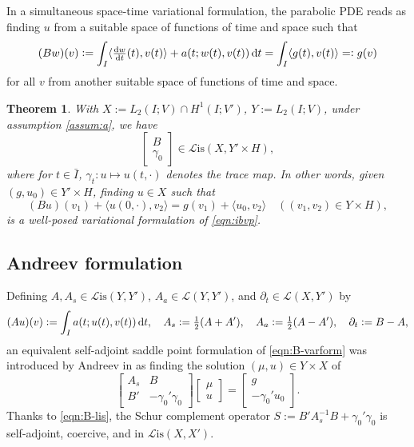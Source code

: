 \documentclass[11pt,a4paper,oneside,english]{amsart}
\numberwithin{equation}{section}
\newtheorem{theorem}{Theorem}
\numberwithin{theorem}{section}
\theoremstyle{definition}
\newcommand{\la}{\langle}
\newcommand{\ra}{\rangle}
\newcommand{\cL}{\mathcal L}
\newcommand{\Lis}{\cL\mathrm{is}}
\begin{document}
In a simultaneous space-time variational formulation, the parabolic PDE reads as
finding $u$ from a suitable space of functions of time and space such that
\begin{equation}
  \label{eqn:B-var-form}
  (Bw)(v):=\int_I \la \tfrac{\dif w}{\dif t}(t), v(t) \ra + a(t;w(t),v(t)) \dif t = \int_I \la g(t), v(t) \ra =:g(v)
\end{equation}
for all $v$ from another suitable space of functions of time and space.

\begin{theorem}
  \label{thm:varform}
  With $X:=L_2(I;{V}) \cap H^1(I;V')$, $Y:=L_2(I;{V})$, under assumption \ref{assum:a}, we have
  \begin{equation}
    \label{eqn:B-lis}
    \begin{bmatrix} B \\ \gamma_0\end{bmatrix}\in \Lis(X,Y' \times H),
  \end{equation}
  where for $t \in \bar I$, $\gamma_t\colon u \mapsto u(t,\cdot)$ denotes the trace map.
  In other words, given $(g, u_0) \in Y' \times H$, finding $u \in X$ such that 
  \begin{equation}
    \label{eqn:B-varform}
    (Bu)(v_1)+\la u(0,\cdot),v_2\ra=g(v_1)+\la u_0,v_2\ra\quad ((v_1,v_2) \in Y \times H),
  \end{equation}
  is a well-posed variational formulation of \eqref{eqn:ibvp}.
\end{theorem}

\subsection{Andreev formulation}
Defining $A, A_s \in \Lis(Y,Y')$, $A_a \in \cL(Y,Y')$, and $\partial_t \in \cL(X,Y')$ by 
\[
(Au)(v):=\int_I a(t;u(t),v(t)) \dif t, \quad A_s:=\tfrac12(A+A'), \quad A_a:=\tfrac12(A-A'), \quad \partial_t:=B-A,
\]
an equivalent self-adjoint saddle point formulation of \eqref{eqn:B-varform} was
introduced by Andreev in \cite{Andreev2013} as finding the solution $(\mu,u) \in Y\times X$ of
\[
  \begin{bmatrix} A_s & B\\ B' & -\gamma_0' \gamma_0 \end{bmatrix}
  \begin{bmatrix} \mu \\ u \end{bmatrix}=
  \begin{bmatrix} g \\ -\gamma_0' u_0 \end{bmatrix}.
\]
Thanks to \eqref{eqn:B-lis}, the Schur complement operator $S := B' A_s^{-1} B+\gamma_0'\gamma_0$ is self-adjoint, coercive, and in $\Lis(X, X')$.
\end{document}
